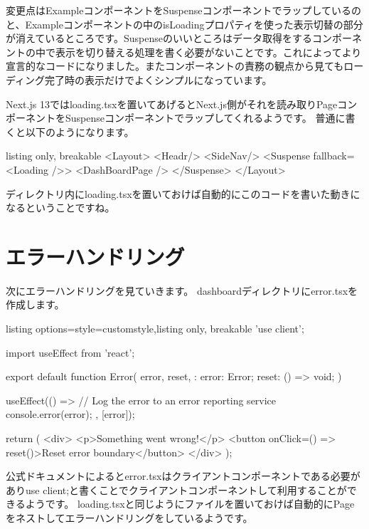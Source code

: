 変更点はExampleコンポーネントをSuspenseコンポーネントでラップしているのと、Exampleコンポーネントの中のisLoadingプロパティを使った表示切替の部分が消えているところです。Suspenseのいいところはデータ取得をするコンポーネントの中で表示を切り替える処理を書く必要がないことです。これによってより宣言的なコードになりました。またコンポーネントの責務の観点から見てもローディング完了時の表示だけでよくシンプルになっています。

Next.js 13ではloading.tsxを置いてあげるとNext.js側がそれを読み取りPageコンポーネントをSuspenseコンポーネントでラップしてくれるようです。
普通に書くと以下のようになります。



\begin{tcblisting}{listing only, breakable}
  <Layout>
  <Headr/>
  <SideNav/>
  <Suspense fallback={<Loading />}>
  <DashBoardPage />
  </Suspense>
  </Layout>
\end{tcblisting}


ディレクトリ内にloading.tsxを置いておけば自動的にこのコードを書いた動きになるということですね。


\section{エラーハンドリング}

次にエラーハンドリングを見ていきます。
dashboardディレクトリにerror.tsxを作成します。


\begin{tcblisting}{listing options={style=customstyle},listing only, breakable}
  'use client';

  import { useEffect } from 'react';

  export default function Error({
      error,
      reset,
    }: {
  error: Error;
  reset: () => void;
  }) {
  useEffect(() => {
  // Log the error to an error reporting service
  console.error(error);
  }, [error]);

  return (
  <div>
  <p>Something went wrong!</p>
  <button onClick={() => reset()}>Reset error boundary</button>
  </div>
  );
  }
\end{tcblisting}



公式ドキュメントによるとerror.tsxはクライアントコンポーネントである必要がありuse client;と書くことでクライアントコンポーネントして利用することができるようです。
loading.tsxと同じようにファイルを置いておけば自動的にPageをネストしてエラーハンドリングをしているようです。

